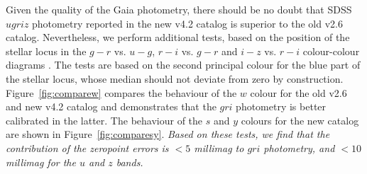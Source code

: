 \documentclass[fleqn,usenatbib]{mnras}
\begin{document}
Given the quality of the Gaia photometry, there should be no doubt that SDSS $ugriz$ photometry
reported in the new v4.2 catalog is superior to the old v2.6 catalog. Nevertheless, we perform
additional tests, based on the position of the stellar locus in the $g-r$ vs. $u-g$, $r-i$ vs. $g-r$ 
and $i-z$ vs. $r-i$ colour-colour diagrams  \citep{2004AN....325..583I}. The tests are based
on the second principal colour for the blue part of the stellar locus, whose median should 
not deviate from zero by construction. Figure~\ref{fig:comparew} compares the behaviour
of the $w$ colour for the old v2.6 and new v4.2 catalog and demonstrates that the $gri$
photometry is better calibrated in the latter. The behaviour of the $s$ and $y$ colours for the 
new catalog are shown in Figure~\ref{fig:comparesy}. {\it Based on these tests, we find that 
the contribution of the zeropoint errors is $<5$ millimag to $gri$ photometry, and 
$<10$ millimag for the $u$ and $z$ bands.} 
\end{document}
